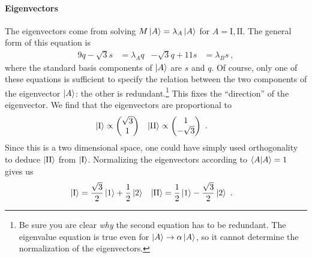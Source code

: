 \documentclass[12pt, oneside]{report}    %
\begin{document}
\paragraph{Eigenvectors} The eigenvectors come from solving $M\left|A\right\rangle = \lambda_A \left|A\right\rangle$ for $A=\text{I}, \text{II}$. The general form of this equation is
\begin{align}
    9q - \sqrt{3}s &= \lambda_A q
    &
    -\sqrt{3}q + 11 s &= \lambda_B s \ ,
\end{align}
where the standard basis components of $\left|A\right\rangle$ are $s$ and $q$. Of course, only one of these equations is sufficient to specify the relation between the two components of the eigenvector $\left|A\right\rangle$: the other is redundant.\footnote{Be sure you are clear \emph{why} the second equation has to be redundant. The eigenvalue equation is true even for $\left|A\right\rangle\to \alpha\left|A\right\rangle$, so it cannot determine the normalization of the eigenvectors.} This fixes the ``direction'' of the eigenvector. We find that the eigenvectors are proportional to 
\begin{align}
    \left|\textnormal{I}\right\rangle
    &\propto 
    \begin{pmatrix}
        \sqrt{3}\\ 1
    \end{pmatrix}
    &
    \left|\textnormal{II}\right\rangle
    &\propto 
    \begin{pmatrix}
        1\\ -\sqrt{3}
    \end{pmatrix} \ .
\end{align}
Since this is a two dimensional space, one could have simply used orthogonality to deduce $\left|\textnormal{II}\right\rangle$ from $\left|\textnormal{I}\right\rangle$. Normalizing the eigenvectors according to $\langle A | A\rangle = 1$ gives us
\begin{align}
    \left|\textnormal{I}\right\rangle
    &=
    \frac{\sqrt{3}}{2} 
    \left|1\right\rangle
    + 
    \frac{1}{2}
    \left|2\right\rangle
    &
    \left|\textnormal{II}\right\rangle
    &=
    \frac{1}{2}
    \left|1\right\rangle 
    - 
    \frac{\sqrt{3}}{2}
    \left|2\right\rangle
    \ .
    \label{eq:ex:greens:func:eig:in:std}
\end{align}
\end{document}
